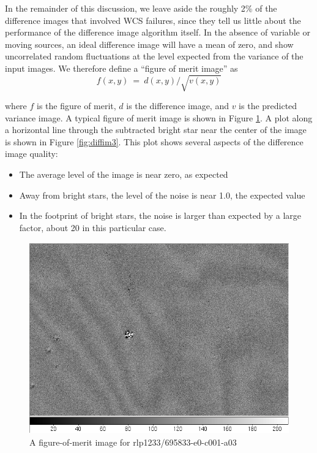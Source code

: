 In the remainder of this discussion, we leave aside the roughly 2\% of
the difference images that involved WCS failures, since they tell us
little about the performance of the difference image algorithm itself.
In the absence of variable or moving sources, an ideal difference
image will have a mean of zero, and show uncorrelated random
fluctuations at the level expected from the variance of the input
images.  We therefore define a ``figure of merit image'' as
\begin{equation}
f(x,y)~=~d(x,y)/\sqrt {v(x,y)}
\end{equation} 

where $f$ is the figure of merit, $d$ is the difference image, and $v$
is the predicted variance image.  A typical figure of merit image is
shown in Figure \ref{fig:diffim2}.  A plot along a horizontal line through
the subtracted bright star near the center of the image is shown in
Figure \ref{fig:diffim3}.  This plot shows several aspects of the difference
image quality:

\begin{itemize}
\item The average level of the image is near zero, as expected
\item Away from bright stars, the level of the noise is near 1.0, the
  expected value
\item In the footprint of bright stars, the noise is larger than
  expected by a large factor, about 20 in this particular case.
\end{itemize}  

\begin{figure}[p]
\begin{center}
\includegraphics[height=3.25in]{images/rlp1233_v695833-e0-c001-a03-fom_img.png}
\caption{A figure-of-merit image for
  rlp1233/695833-e0-c001-a03}  
\label{fig:diffim2}
\end{center}
\end{figure}


